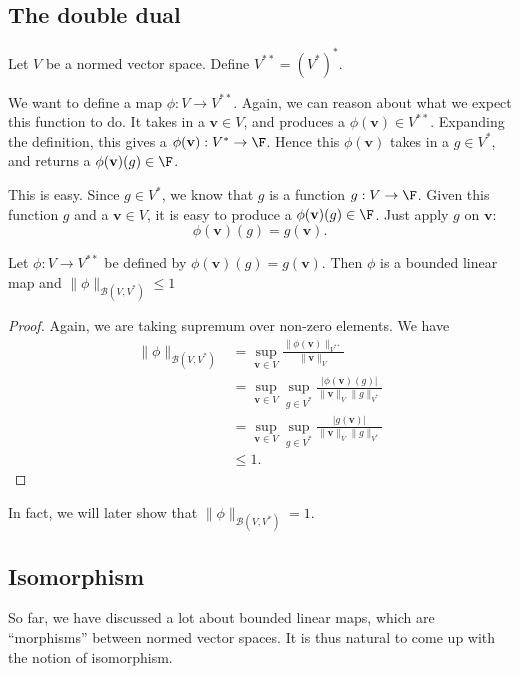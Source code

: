 \documentclass[a4paper]{article}
\begin{document}
\subsection{The double dual}
\begin{defi}
  Let $V$ be a normed vector space. Define $V^{**} = (V^*)^*$.
\end{defi}

We want to define a map $\phi: V\to V^{**}$. Again, we can reason about what we expect this function to do. It takes in a $\mathbf{v}\in V$, and produces a $\phi(\mathbf{v}) \in V^{**}$. Expanding the definition, this gives a $\phi(\mathbf{v}): V^* \to \F$. Hence this $\phi(\mathbf{v})$ takes in a $g\in V^*$, and returns a $\phi(\mathbf{v})(g)\in \F$.

This is easy. Since $g \in V^*$, we know that $g$ is a function $g: V\to \F$. Given this function $g$ and a $\mathbf{v}\in V$, it is easy to produce a $\phi(\mathbf{v})(g)\in \F$. Just apply $g$ on $\mathbf{v}$:
\[
  \phi(\mathbf{v})(g) = g(\mathbf{v}).
\]
\begin{prop}
  Let $\phi: V\to V^{**}$ be defined by $\phi(\mathbf{v})(g) = g(\mathbf{v})$. Then $\phi$ is a bounded linear map and $\|\phi\|_{\mathcal{B}(V, V^*)} \leq 1$
\end{prop}

\begin{proof}
  Again, we are taking supremum over non-zero elements. We have
  \begin{align*}
    \|\phi\|_{\mathcal{B}(V, V^*)} &= \sup_{\mathbf{v}\in V} \frac{\|\phi(\mathbf{v})\|_{V^{**}}}{\|\mathbf{v}\|_V}\\
    &= \sup_{\mathbf{v}\in V} \sup_{g\in V^*}\frac{|\phi(\mathbf{v})(g)|}{\|\mathbf{v}\|_V\|g\|_{V^*}}\\
    &= \sup_{\mathbf{v}\in V}\sup_{g\in V^*}\frac{|g(\mathbf{v})|}{\|\mathbf{v}\|_V\|g\|_{V^*}}\\
    &\leq 1.
  \end{align*}
\end{proof}
In fact, we will later show that $\|\phi\|_{\mathcal{B}(V, V^*)} = 1$.

\subsection{Isomorphism}
So far, we have discussed a lot about bounded linear maps, which are ``morphisms'' between normed vector spaces. It is thus natural to come up with the notion of isomorphism.
\end{document}
